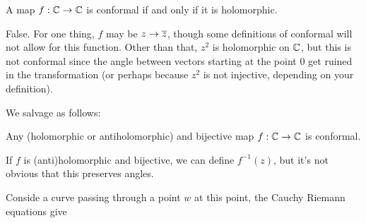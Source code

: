 \documentclass{homework}
\begin{document}
                                                                                                                                                                                        \begin{problem}
                                                                                                                                                                                          A map $f : \mathbb{C} \to \mathbb{C}$ is conformal if and only if it is holomorphic.
                                                                                                                                                                                          \end{problem}
                                                                                                                                                                                          \begin{solution}
                                                                                                                                                                                          False. For one thing, $f$ may be $z\to \overline{z}$, though some definitions of conformal will not allow for this function. Other than that, $z^2$ is holomorphic on $\mathbb{C}$, but this is not conformal since the angle between vectors starting at the point $0$ get ruined in the transformation (or perhaps because $z^2$ is not injective, depending on your definition).

                                                                                                                                                                                          We salvage as follows:

                                                                                                                                                                                          Any (holomorphic or antiholomorphic) and bijective map $f : \mathbb{C} \to \mathbb{C}$ is conformal.

                                                                                                                                                                                          If $f$ is (anti)holomorphic and bijective, we can define $f^{-1}(z)$, but it's not obvious that this preserves angles.

                                                                                                                                                                                          Conside a curve passing through a point $w$ at this point, the Cauchy Riemann equations give


\end{solution}
\end{document}
